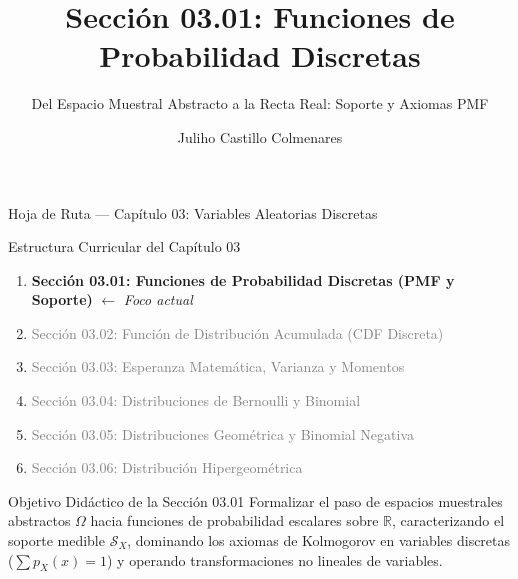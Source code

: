 \documentclass[10pt, aspectratio=169]{beamer}
\title[Funciones de Probabilidad Discretas]{Sección 03.01: Funciones de Probabilidad Discretas}
\subtitle{Del Espacio Muestral Abstracto a la Recta Real: Soporte y Axiomas PMF}
\author[J. Castillo Colmenares]{Juliho Castillo Colmenares}
\institute{Tecnológico de Monterrey}
\date{\vspace{-2.0cm}}
\begin{document}
\begin{frame}[plain]
  \vspace{-0.5cm}
  \titlepage
\end{frame}

\begin{frame}{Hoja de Ruta — Capítulo 03: Variables Aleatorias Discretas}
  \begin{block}{Estructura Curricular del Capítulo 03}
    \footnotesize
    \begin{enumerate}\itemsep=0.08cm
      \item \textbf{\textcolor{TecRojo}{Sección 03.01: Funciones de Probabilidad Discretas (PMF y Soporte)}} $\leftarrow$ \emph{Foco actual}
      \item \textcolor{gray}{Sección 03.02: Función de Distribución Acumulada (CDF Discreta)}
      \item \textcolor{gray}{Sección 03.03: Esperanza Matemática, Varianza y Momentos}
      \item \textcolor{gray}{Sección 03.04: Distribuciones de Bernoulli y Binomial}
      \item \textcolor{gray}{Sección 03.05: Distribuciones Geométrica y Binomial Negativa}
      \item \textcolor{gray}{Sección 03.06: Distribución Hipergeométrica}
    \end{enumerate}
  \end{block}
  \vspace{-0.05cm}
  \pause
  \begin{alertblock}{Objetivo Didáctico de la Sección 03.01}
    \footnotesize
    Formalizar el paso de espacios muestrales abstractos $\Omega$ hacia funciones de probabilidad escalares sobre $\mathbb{R}$, caracterizando el soporte medible $\mathcal{S}_X$, dominando los axiomas de Kolmogorov en variables discretas ($\sum p_X(x)=1$) y operando transformaciones no lineales de variables.
  \end{alertblock}
\end{frame}
\end{document}
